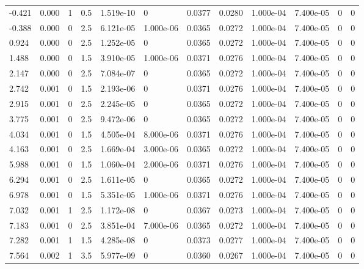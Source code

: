 \documentclass[preview]{standalone}
\begin{document}
{{\begin{tabular}{L{1.2cm}C{1.2cm} C{0.3cm}C{0.5cm} C{1.4cm}C{1.4cm} C{1.4cm}C{1.4cm} C{1.6cm}C{1.6cm} C{1.6cm}C{1.6cm}}
  -0.421  &  0.000  & 1     & 0.5 &  1.519e-10  & 0  &  0.0377&   0.0280& 1.000e-04 & 7.400e-05   &  0 & 0  \\ 
  -0.388  &  0.000  & 0     & 2.5 &  6.121e-05  & 1.000e-06  &  0.0365&   0.0272& 1.000e-04 & 7.400e-05   &  0 & 0  \\ 
  0.924  &  0.000  & 0     & 2.5 &  1.252e-05  & 0  &  0.0365&   0.0272& 1.000e-04 & 7.400e-05   &  0 & 0  \\ 
  1.488  &  0.000  & 0     & 1.5 &  3.910e-05  & 1.000e-06  &  0.0371&   0.0276& 1.000e-04 & 7.400e-05   &  0 & 0  \\ 
  2.147  &  0.000  & 0     & 2.5 &  7.084e-07  & 0  &  0.0365&   0.0272& 1.000e-04 & 7.400e-05   &  0 & 0  \\ 
  2.742  &  0.001  & 0     & 1.5 &  2.193e-06  & 0  &  0.0371&   0.0276& 1.000e-04 & 7.400e-05   &  0 & 0  \\ 
  2.915  &  0.001  & 0     & 2.5 &  2.245e-05  & 0  &  0.0365&   0.0272& 1.000e-04 & 7.400e-05   &  0 & 0  \\ 
  3.775  &  0.001  & 0     & 2.5 &  9.472e-06  & 0  &  0.0365&   0.0272& 1.000e-04 & 7.400e-05   &  0 & 0  \\ 
  4.034  &  0.001  & 0     & 1.5 &  4.505e-04  & 8.000e-06  &  0.0371&   0.0276& 1.000e-04 & 7.400e-05   &  0 & 0  \\ 
  4.163  &  0.001  & 0     & 2.5 &  1.669e-04  & 3.000e-06  &  0.0365&   0.0272& 1.000e-04 & 7.400e-05   &  0 & 0  \\ 
  5.988  &  0.001  & 0     & 1.5 &  1.060e-04  & 2.000e-06  &  0.0371&   0.0276& 1.000e-04 & 7.400e-05   &  0 & 0  \\ 
  6.294  &  0.001  & 0     & 2.5 &  1.611e-05  & 0  &  0.0365&   0.0272& 1.000e-04 & 7.400e-05   &  0 & 0  \\ 
  6.978  &  0.001  & 0     & 1.5 &  5.351e-05  & 1.000e-06  &  0.0371&   0.0276& 1.000e-04 & 7.400e-05   &  0 & 0  \\ 
  7.032  &  0.001  & 1     & 2.5 &  1.172e-08  & 0  &  0.0367&   0.0273& 1.000e-04 & 7.400e-05   &  0 & 0  \\ 
  7.183  &  0.001  & 0     & 2.5 &  3.851e-04  & 7.000e-06  &  0.0365&   0.0272& 1.000e-04 & 7.400e-05   &  0 & 0  \\ 
  7.282  &  0.001  & 1     & 1.5 &  4.285e-08  & 0  &  0.0373&   0.0277& 1.000e-04 & 7.400e-05   &  0 & 0  \\ 
  7.564  &  0.002  & 1     & 3.5 &  5.977e-09  & 0  &  0.0360&   0.0267& 1.000e-04 & 7.400e-05   &  0 & 0  \\ 

\end{tabular}}}
\end{document}
